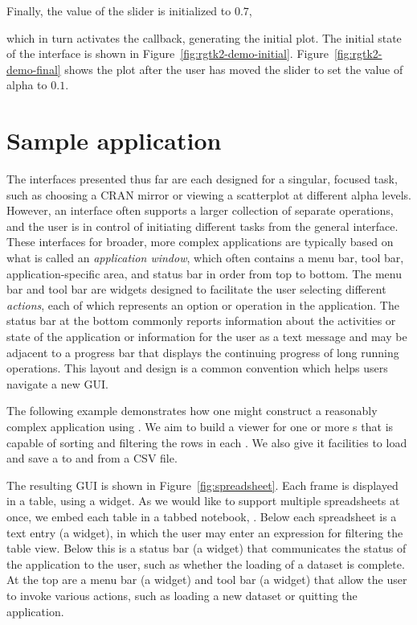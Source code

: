 \documentclass[article,shortnames]{jss}
\begin{document}
Finally, the value of the slider is initialized to $0.7$,
which in turn activates the callback, generating the initial plot. The
initial state of the interface is shown in Figure~\ref{fig:rgtk2-demo-initial}.  Figure~\ref{fig:rgtk2-demo-final} shows
the plot after the user has moved the slider to set the value of alpha
to $0.1$.


\section{Sample application}\label{sec:spreadsheet-example}

The interfaces presented thus far are each designed for a singular,
focused task, such as choosing a CRAN mirror or viewing a scatterplot
at different alpha levels.  However, an interface often supports a
larger collection of separate operations, and the user is in control
of initiating different tasks from the general interface. These
interfaces for broader, more complex
applications are typically based on what is called an
\emph{application window}, which often contains a menu bar, tool bar,
application-specific area, and status bar in order from top to
bottom. The menu bar and tool bar are widgets designed to facilitate
the user selecting different \emph{actions}, each of which represents
an option or operation in the application.  The status bar at the
bottom commonly reports information about the activities or state of
the application or information for the user as a text message and may
be adjacent to a progress bar that displays the continuing progress of
long running operations.  This layout and design is a common
convention which helps users navigate a new GUI.


The following example demonstrates how one might construct a
reasonably complex
application using . We aim to build a viewer for one or
more  s that is capable of sorting and
filtering the
rows in each . We also give it facilities to load and
save a  to and from a CSV file. 

The resulting GUI is shown in Figure~\ref{fig:spreadsheet}. Each
 frame is displayed in a table, using a
 widget. As we would like to support multiple
spreadsheets at once, we embed each table in a tabbed notebook,
. Below each spreadsheet is a text entry (a
 widget), in which the user may enter an expression for
filtering the table view. Below this is a status bar (a
 widget) that communicates the status
of the application to the user, such as whether the loading of a
dataset is complete. At the top are a menu bar (a 
widget) and tool bar (a  widget) that allow the user
to invoke various actions, such as loading a new dataset or quitting
the application.
\end{document}
